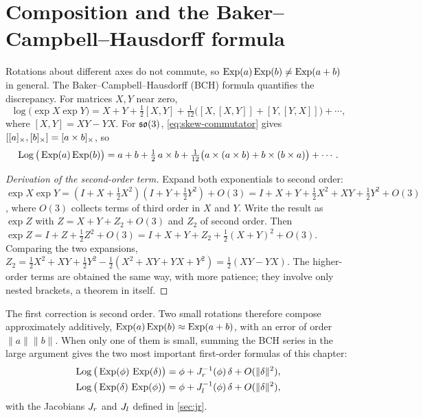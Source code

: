 \section{Composition and the Baker--Campbell--Hausdorff formula}

Rotations about different axes do not commute, so $\operatorname{Exp}(a)\operatorname{Exp}(b) \neq \operatorname{Exp}(a + b)$ in general. The
Baker--Campbell--Hausdorff (BCH) formula quantifies the discrepancy. For matrices $X, Y$ near zero,
\begin{equation}
  \log\big(\exp X \exp Y\big) = X + Y + \tfrac12[X, Y] + \tfrac1{12}\big([X,[X,Y]] + [Y,[Y,X]]\big) + \cdots,
\end{equation}
where $[X, Y] = XY - YX$. For $\mathfrak{so}(3)$, \eqref{eq:skew-commutator} gives $[[a]_{\times}, [b]_{\times}] = [a\times b]_{\times}$, so
\begin{equation}
  \operatorname{Log}\big(\operatorname{Exp}(a)\operatorname{Exp}(b)\big) = a + b + \tfrac12\, a\times b
     + \tfrac1{12}\big( a\times(a\times b) + b\times(b\times a)\big) + \cdots .
  \label{eq:bch}
\end{equation}

\begin{proof}[Derivation of the second-order term]
Expand both exponentials to second order: $\exp X\exp Y = (I + X + \tfrac12X^2)(I + Y + \tfrac12Y^2) + O(3) = I + X + Y + \tfrac12X^2 + XY + \tfrac12Y^2 + O(3)$,
where $O(3)$ collects terms of third order in $X$ and $Y$. Write the result as $\exp Z$ with $Z = X + Y + Z_2 + O(3)$ and $Z_2$ of second order. Then
$\exp Z = I + Z + \tfrac12Z^2 + O(3) = I + X + Y + Z_2 + \tfrac12(X + Y)^2 + O(3)$. Comparing the two expansions,
$Z_2 = \tfrac12X^2 + XY + \tfrac12Y^2 - \tfrac12(X^2 + XY + YX + Y^2) = \tfrac12(XY - YX)$. The higher-order terms are obtained the same way, with
more patience; they involve only nested brackets, a theorem in itself.
\end{proof}
The first correction is second order. Two small rotations therefore compose approximately additively,
$\operatorname{Exp}(a)\operatorname{Exp}(b) \approx \operatorname{Exp}(a + b)$, with an error of order $\|a\|\|b\|$. When only one of them is small,
summing the BCH series in the large argument gives the two most important first-order formulas of
this chapter:
\begin{align}
  \operatorname{Log}\big(\operatorname{Exp}(\phi)\,\operatorname{Exp}(\delta)\big) &= \phi + J_r^{-1}(\phi)\,\delta + O(\|\delta\|^2), \label{eq:bch-right}\\
  \operatorname{Log}\big(\operatorname{Exp}(\delta)\,\operatorname{Exp}(\phi)\big) &= \phi + J_l^{-1}(\phi)\,\delta + O(\|\delta\|^2), \label{eq:bch-left}
\end{align}
with the Jacobians $J_r$ and $J_l$ defined in \cref{sec:jr}.

